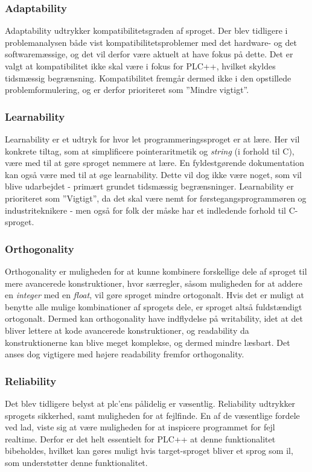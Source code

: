 \subsubsection{Adaptability} 
Adaptability udtrykker kompatibilitetsgraden af sproget. Der blev tidligere i problemanalysen både vist kompatibilitetsproblemer med det hardware- og det softwaremæssige, og det vil derfor være aktuelt at have fokus på dette. Det er valgt at kompatibilitet ikke skal være i fokus for PLC++, hvilket skyldes tidsmæssig begrænsning. Kompatibilitet fremgår dermed ikke i den opstillede problemformulering, og er derfor prioriteret som ”Mindre vigtigt”.  

\subsubsection{Learnability} 
Learnability er et udtryk for hvor let programmeringssproget er at lære. Her vil konkrete tiltag, som at simplificere pointeraritmetik og \textit{string} (i forhold til C), være med til at gøre sproget nemmere at lære. En fyldestgørende dokumentation kan også være med til at øge learnability. Dette vil dog ikke være noget, som vil blive udarbejdet - primært grundet tidsmæssig begrænsninger. Learnability er prioriteret som ”Vigtigt”, da det skal være nemt for førstegangsprogrammøren og industriteknikere - men også for folk der måske har et indledende forhold til C-sproget.

\subsubsection{Orthogonality} 
Orthogonality er muligheden for at kunne kombinere forskellige dele af sproget til mere avancerede konstruktioner, hvor særregler, såsom muligheden for at addere en \textit{integer} med en \textit{float}, vil gøre sproget mindre ortogonalt. Hvis det er muligt at benytte alle mulige kombinationer af sprogets dele, er sproget altså fuldstændigt ortogonalt. Dermed kan orthogonality have indflydelse på writability, idet at det bliver lettere at kode avancerede konstruktioner, og readability da konstruktionerne kan blive meget komplekse, og dermed mindre læsbart. Det anses dog vigtigere med højere readability fremfor orthogonality.

\subsubsection{Reliability} 
Det blev tidligere belyst at \gls{plc}'ens pålidelig er væsentlig. Reliability udtrykker sprogets sikkerhed, samt muligheden for at fejlfinde. En af de væsentlige fordele ved \gls{lad}, viste sig at være muligheden for at inspicere programmet for fejl realtime. Derfor er det helt essentielt for PLC++ at denne funktionalitet bibeholdes, hvilket kan gøres muligt hvis target-sproget bliver et sprog som \gls{il}, som understøtter denne funktionalitet.

